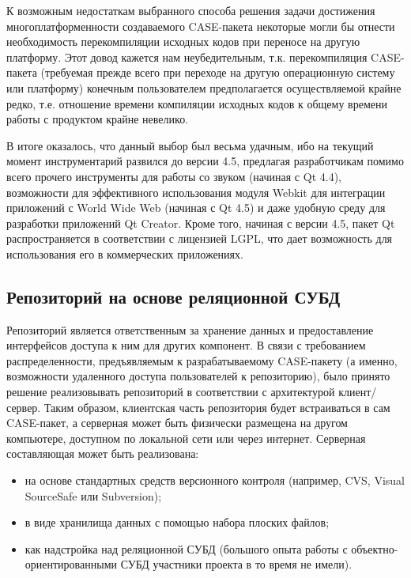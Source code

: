 \documentclass[a5paper]{article}
\begin{document}
К возможным недостаткам выбранного способа решения задачи достижения
многоплатформенности создаваемого CASE-пакета некоторые могли бы отнести
необходимость перекомпиляции исходных кодов при переносе на другую
платформу. Этот довод кажется нам неубедительным, т.к. перекомпиляция
CASE-пакета (требуемая прежде всего при переходе на другую операционную систему или платформу) конечным
пользователем предполагается осуществляемой крайне редко, т.е.
отношение времени компиляции исходных кодов к общему времени работы с
продуктом крайне невелико.

В итоге оказалось, что данный выбор был весьма удачным, ибо на текущий
момент инструментарий развился до версии 4.5, предлагая разработчикам
помимо всего прочего инструменты для работы со звуком (начиная с
Qt 4.4), возможности для эффективного использования модуля Webkit для интеграции
приложений с World Wide Web (начиная с Qt 4.5) и даже удобную среду для
разработки приложений Qt Creator. Кроме того, начиная с версии 4.5,
пакет Qt распространяется в соответствии с лицензией LGPL, что дает возможность для
использования его в коммерческих приложениях.

\subsection{Репозиторий на основе реляционной СУБД}

Репозиторий является ответственным за хранение данных и предоставление
интерфейсов доступа к ним для других компонент. В связи с требованием
распределенности, предъявляемым к разрабатываемому
CASE-пакету (а именно, возможности удаленного доступа пользователей к репозиторию), было принято решение
реализовывать репозиторий в соответствии с архитектурой клиент/сервер.
Таким образом, клиентская часть репозитория будет встраиваться в сам
CASE-пакет, а серверная может быть физически размещена на другом компьютере, доступном по локальной сети
или через интернет. Серверная составляющая может быть реализована:

\begin{itemize}
  \item на основе стандартных средств версионного контроля (например,
        CVS, Visual SourceSafe или Subversion);
  \item в виде хранилища данных с помощью набора плоских файлов;
  \item как надстройка над реляционной СУБД (большого опыта работы с
        объектно-ориентированными СУБД участники проекта в то время не имели).
\end{itemize}
\end{document}

